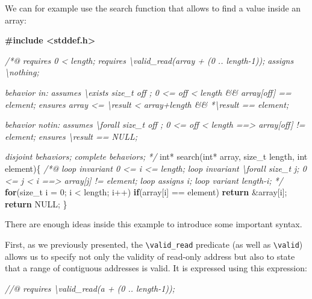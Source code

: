 \documentclass[12pt,francais,]{scrbook}
\newenvironment{Shaded}{}{}
\newcommand{\KeywordTok}[1]{\textcolor[rgb]{0.00,0.44,0.13}{\textbf{{#1}}}}
\newcommand{\DataTypeTok}[1]{\textcolor[rgb]{0.56,0.13,0.00}{{#1}}}
\newcommand{\DecValTok}[1]{\textcolor[rgb]{0.25,0.63,0.44}{{#1}}}
\newcommand{\CommentTok}[1]{\textcolor[rgb]{0.38,0.63,0.69}{\textit{{#1}}}}
\newcommand{\ErrorTok}[1]{\textcolor[rgb]{1.00,0.00,0.00}{\textbf{{#1}}}}
\newcommand{\NormalTok}[1]{{#1}}
\begin{document}
We can for example use the search function that allows to find a value
inside an array:

\begin{footnotesize}\begin{Shaded}
\begin{Highlighting}[]
\ErrorTok{#include <stddef.h>}

\CommentTok{/*@}
\CommentTok{  requires 0 < length;}
\CommentTok{  requires \textbackslash{}valid_read(array + (0 .. length-1));}
\CommentTok{  }
\CommentTok{  assigns  \textbackslash{}nothing;}

\CommentTok{  behavior in:}
\CommentTok{    assumes \textbackslash{}exists size_t off ; 0 <= off < length && array[off] == element;}
\CommentTok{    ensures array <= \textbackslash{}result < array+length && *\textbackslash{}result == element;}

\CommentTok{  behavior notin:}
\CommentTok{    assumes \textbackslash{}forall size_t off ; 0 <= off < length ==> array[off] != element;}
\CommentTok{    ensures \textbackslash{}result == NULL;}

\CommentTok{  disjoint behaviors;}
\CommentTok{  complete behaviors;}
\CommentTok{*/}
\DataTypeTok{int}\NormalTok{* search(}\DataTypeTok{int}\NormalTok{* array, size_t length, }\DataTypeTok{int} \NormalTok{element)\{}
  \CommentTok{/*@}
\CommentTok{    loop invariant 0 <= i <= length;}
\CommentTok{    loop invariant \textbackslash{}forall size_t j; 0 <= j < i ==> array[j] != element;}
\CommentTok{    loop assigns i;}
\CommentTok{    loop variant length-i;}
\CommentTok{  */} 
  \KeywordTok{for}\NormalTok{(size_t i = }\DecValTok{0}\NormalTok{; i < length; i++)}
    \KeywordTok{if}\NormalTok{(array[i] == element) }\KeywordTok{return} \NormalTok{&array[i];}
  \KeywordTok{return} \NormalTok{NULL;}
\NormalTok{\}}
\end{Highlighting}
\end{Shaded}\end{footnotesize}

There are enough ideas inside this example to introduce some important
syntax.

First, as we previously presented, the
\texttt{\textbackslash{}valid\_read} predicate (as well as
\texttt{\textbackslash{}valid}) allows us to specify not only the
validity of read-only address but also to state that a range of
contiguous addresses is valid. It is expressed using this expression:

\begin{footnotesize}\begin{Shaded}
\begin{Highlighting}[]
\CommentTok{//@ requires \textbackslash{}valid_read(a + (0 .. length-1));}
\end{Highlighting}
\end{Shaded}\end{footnotesize}
\end{document}
